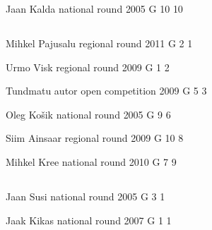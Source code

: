 \documentclass[11pt]{article}
\begin{document}
\ylDisplay{} %
{Jaan Kalda} %
{national round} %
{2005} %
{G 10} %
{10} %
{

\ifEngStatement
\fi
}
\newpage\subsection{\protect{}}

\ylDisplay{} %
{Mihkel Pajusalu} %
{regional round} %
{2011} %
{G 2} %
{1} %
{

\ifEngStatement
\fi
}

\ylDisplay{} %
{Urmo Visk} %
{regional round} %
{2009} %
{G 1} %
{2} %
{

\ifEngStatement
\fi
}

\ylDisplay{} %
{Tundmatu autor} %
{open competition} %
{2009} %
{G 5} %
{3} %
{

\ifEngStatement
\fi
}

\ylDisplay{} %
{Oleg Košik} %
{national round} %
{2005} %
{G 9} %
{6} %
{

\ifEngStatement
\fi
}

\ylDisplay{} %
{Siim Ainsaar} %
{regional round} %
{2009} %
{G 10} %
{8} %
{

\ifEngStatement
\fi
}

\ylDisplay{} %
{Mihkel Kree} %
{national round} %
{2010} %
{G 7} %
{9} %
{

\ifEngStatement
\fi
}
\newpage\subsection{\protect{}}

\ylDisplay{} %
{Jaan Susi} %
{national round} %
{2005} %
{G 3} %
{1} %
{

\ifEngStatement
\fi
}

\ylDisplay{} %
{Jaak Kikas} %
{national round} %
{2007} %
{G 1} %
{1} %
{

\ifEngStatement
\fi
}
\end{document}
